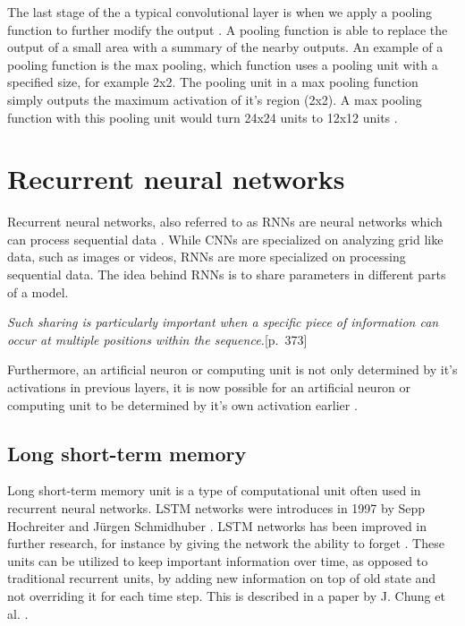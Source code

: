 The last stage of the a typical convolutional layer is when we apply a pooling function to further modify the output \parencite{zhou_computation_1988}. A pooling function is able to replace the output of a small area with a summary of the nearby outputs. An example of a pooling function is the max pooling, which function uses a pooling unit with a specified size, for example 2x2. The pooling unit in a max pooling function simply outputs the maximum activation of it's region (2x2). A max pooling function with this pooling unit would turn 24x24 units to 12x12 units \cite{goodfellow_deep_2016} \cite{nielsen_neural_2015}.

\section{Recurrent neural networks}

Recurrent neural networks, also referred to as RNNs  are neural networks which can process sequential data \cite{rumelhart_learning_1986}. While CNNs are specialized on analyzing grid like data, such as images or videos, RNNs are more specialized on processing sequential data. The idea behind RNNs is to share parameters in different parts of a model. 

\begin{displayquote}
 \textit{Such sharing is particularly important when a specific piece of information can occur at multiple positions within the sequence.}{\cite{goodfellow_deep_2016}[p.~373]}
\end{displayquote}

Furthermore, an artificial neuron or computing unit is not only determined by it's activations in previous layers, it is now possible for an artificial neuron or computing unit to be determined by it's own activation earlier \cite{goodfellow_deep_2016} \cite{nielsen_neural_2015}.

\subsection{Long short-term memory}
\label{theory-LSTM}

Long short-term memory unit is a type of computational unit often used in recurrent neural networks. LSTM networks were introduces in 1997 by Sepp Hochreiter and Jürgen Schmidhuber \cite{hochreiter_long_1997}. LSTM networks has been improved in further research, for instance by giving the network the ability to forget \cite{gers_learning_1999}. These units can be utilized to keep important information over time, as opposed to traditional recurrent units, by adding new information on top of old state and not overriding it for each time step. This is described in a paper by J. Chung et al. \cite{chung_empirical_2014}.

